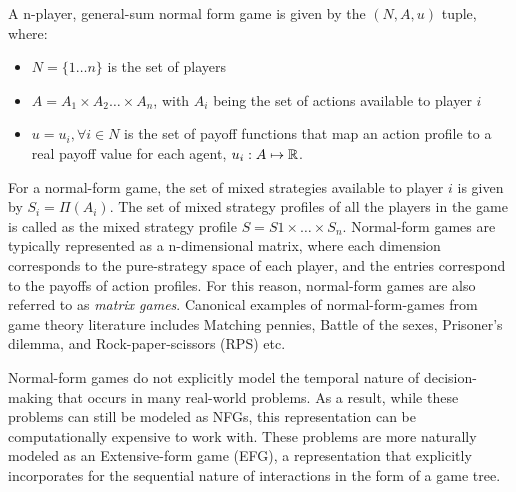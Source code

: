 \begin{definition} A n-player, general-sum normal form game is given by the $(N,
		A, u)$ tuple, where:
	\begin{itemize}
		\item $N = \{1 \dots n \}$ is the set of players
		\item $A =
			      A_1 \times A_2 \ldots \times A_n$, with $A_i$ being the set of actions available to player $i$
		\item $u = {u_i, \forall i \in N}$ is the set of payoff functions that map an action profile to a
		      real payoff value for each agent, $u_i: A \mapsto \mathbb{R}$.
	\end{itemize}
\end{definition}

For a normal-form game, the set of mixed strategies available to player $i$ is given by $S_i =
	\Pi(A_i)$.
The set of mixed strategy profiles of all the players in the game is called as the mixed strategy
profile $S = S1 \times \dots \times S_n$.
Normal-form games are typically represented as a n-dimensional matrix, where each dimension
corresponds to the pure-strategy space of each player, and the entries correspond to the payoffs of
action profiles.
For this reason, normal-form games are also referred to as \textit{matrix games}.
Canonical examples of normal-form-games from game theory literature includes Matching pennies,
Battle of the sexes, Prisoner's dilemma, and Rock-paper-scissors (RPS) etc.

Normal-form games do not explicitly model the temporal nature of decision-making that occurs in
many real-world problems.
As a result, while these problems can still be modeled as NFGs, this representation can be
computationally expensive to work with.
These problems are more naturally modeled as an Extensive-form game (EFG), a representation that
explicitly incorporates for the sequential nature of interactions in the form of a game tree.

